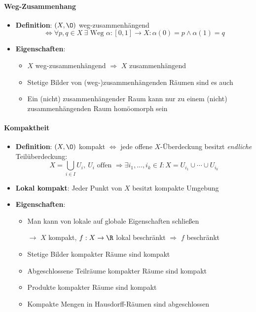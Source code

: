 \paragraph{Weg-Zusammenhang}
\begin{itemize}
  \item \textbf{Definition}: \( (X, \O) \) weg-zusammenhängend
  \begin{equation*}
    \Leftrightarrow \forall p,q \in X \ \exists \text{ Weg } \alpha : [0,1] \to X : \alpha(0) = p \wedge \alpha(1) = q
  \end{equation*}
  \item \textbf{Eigenschaften}:
  \begin{itemize}
    \item \( X \) weg-zusammenhängend \( \Rightarrow \) \( X \) zusammenhängend
    \item Stetige Bilder von (weg-)zusammenhängenden Räumen sind es auch
    \item Ein (nicht) zusammenhängender Raum kann nur zu einem (nicht) zusammenhängenden Raum homöomorph sein
  \end{itemize}
\end{itemize}

\paragraph{Kompaktheit}
\begin{itemize}
  \item \textbf{Definition}: \( (X,\O) \) kompakt \( \Leftrightarrow \) jede offene \( X \)-Überdeckung besitzt \emph{endliche} Teilüberdeckung:
  \begin{equation*}
    X = \bigcup_{i \in I} U_i,\ U_i \text{ offen } \Rightarrow \exists i_1,\dots,i_k \in I: X = U_{i_1} \cup \cdots \cup U_{i_k}
  \end{equation*}
  \item \textbf{Lokal kompakt}: Jeder Punkt von \( X \) besitzt kompakte Umgebung
  \item \textbf{Eigenschaften}:
  \begin{itemize}
    \item Man kann von lokale auf globale Eigenschaften schließen
    \item[\( \to \)] \( X \) kompakt, \( f: X \to \R \) lokal beschränkt \( \Rightarrow \) \( f \) beschränkt
    \item Stetige Bilder kompakter Räume sind kompakt
    \item Abgeschlossene Teilräume kompakter Räume sind kompakt
    \item Produkte kompakter Räume sind kompakt
    \item Kompakte Mengen in Hausdorff-Räumen sind abgeschlossen
  \end{itemize}
\end{itemize}